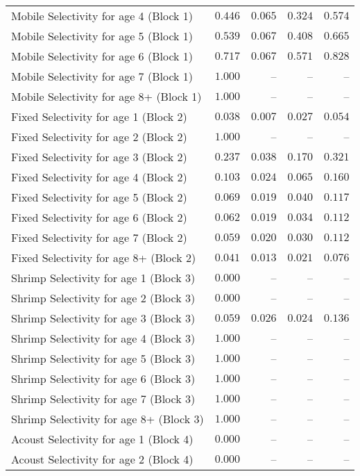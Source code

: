 \documentclass[
]{article}
\begin{document}
\begin{landscape}
\begin{longtable}[t]{lrrrr}
Mobile Selectivity for age 4 (Block 1) & $0.446$ & $0.065$ & $0.324$ & $0.574$\\
Mobile Selectivity for age 5 (Block 1) & $0.539$ & $0.067$ & $0.408$ & $0.665$\\
\addlinespace
Mobile Selectivity for age 6 (Block 1) & $0.717$ & $0.067$ & $0.571$ & $0.828$\\
Mobile Selectivity for age 7 (Block 1) & $1.000$ & -- & -- & --\\
Mobile Selectivity for age 8+ (Block 1) & $1.000$ & -- & -- & --\\
Fixed Selectivity for age 1 (Block 2) & $0.038$ & $0.007$ & $0.027$ & $0.054$\\
Fixed Selectivity for age 2 (Block 2) & $1.000$ & -- & -- & --\\
\addlinespace
Fixed Selectivity for age 3 (Block 2) & $0.237$ & $0.038$ & $0.170$ & $0.321$\\
Fixed Selectivity for age 4 (Block 2) & $0.103$ & $0.024$ & $0.065$ & $0.160$\\
Fixed Selectivity for age 5 (Block 2) & $0.069$ & $0.019$ & $0.040$ & $0.117$\\
Fixed Selectivity for age 6 (Block 2) & $0.062$ & $0.019$ & $0.034$ & $0.112$\\
Fixed Selectivity for age 7 (Block 2) & $0.059$ & $0.020$ & $0.030$ & $0.112$\\
\addlinespace
Fixed Selectivity for age 8+ (Block 2) & $0.041$ & $0.013$ & $0.021$ & $0.076$\\
Shrimp Selectivity for age 1 (Block 3) & $0.000$ & -- & -- & --\\
Shrimp Selectivity for age 2 (Block 3) & $0.000$ & -- & -- & --\\
Shrimp Selectivity for age 3 (Block 3) & $0.059$ & $0.026$ & $0.024$ & $0.136$\\
Shrimp Selectivity for age 4 (Block 3) & $1.000$ & -- & -- & --\\
\addlinespace
Shrimp Selectivity for age 5 (Block 3) & $1.000$ & -- & -- & --\\
Shrimp Selectivity for age 6 (Block 3) & $1.000$ & -- & -- & --\\
Shrimp Selectivity for age 7 (Block 3) & $1.000$ & -- & -- & --\\
Shrimp Selectivity for age 8+ (Block 3) & $1.000$ & -- & -- & --\\
Acoust Selectivity for age 1 (Block 4) & $0.000$ & -- & -- & --\\
\addlinespace
Acoust Selectivity for age 2 (Block 4) & $0.000$ & -- & -- & --\\

\end{longtable}
\end{landscape}
\end{document}
